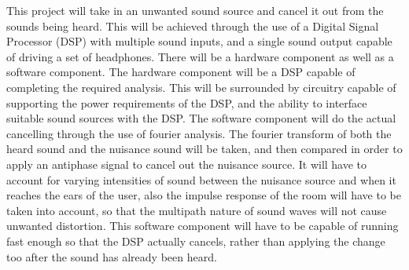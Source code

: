\label{goals}
This project will take in an unwanted sound source and cancel it out from the sounds being heard. This will be achieved through the use of a Digital Signal Processor (DSP) with multiple sound inputs, and a single sound output capable of driving a set of headphones.
There will be a hardware component as well as a software component. The hardware component will be a DSP capable of completing the required analysis. This will be surrounded by circuitry capable of supporting the power requirements of the DSP, and the ability to interface suitable sound sources with the DSP.
The software component will do the actual cancelling through the use of fourier analysis. The fourier transform of both the heard sound and the nuisance sound will be taken, and then compared in order to apply an antiphase signal to cancel out the nuisance source. It will have to account for varying intensities of sound between the nuisance source and when it reaches the ears of the user, also the impulse response of the room will have to be taken into account, so that the multipath nature of sound waves will not cause unwanted distortion. This software component will have to be capable of running fast enough so that the DSP actually cancels, rather than applying the change too after the sound has already been heard.
